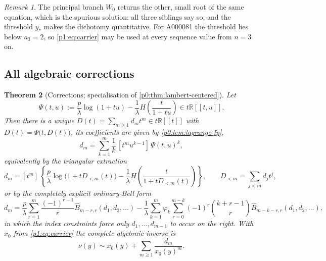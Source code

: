 \documentclass[11pt,a4paper,oneside]{book}
\theoremstyle{plain}
\newtheorem{theorem}{Theorem}[chapter]
\theoremstyle{definition}
\theoremstyle{remark}
\newtheorem{remark}[theorem]{Remark}
\newcommand{\Real}{\mathbb{R}}
\newcommand{\Coef}[1]{[#1]\,}
\newcommand{\OB}{\widehat{B}}
\newcommand{\Wlam}{W}
\begin{document}
\begin{remark}
The principal branch $\Wlam_0$ returns the other, small root of the same equation, which is
the spurious solution: all three siblings say so, and the threshold $y_\ast$ makes the
dichotomy quantitative.  For A000081 the threshold lies below $a_3=2$, so \cref{p1:eq:carrier}
may be used at every sequence value from $n=3$ on.
\end{remark}

\subsection{All algebraic corrections}

\begin{theorem}[Corrections; specialisation of
\cref{p0:thm:lambert-centered}]
\label{p1:thm:d}
Let
\begin{equation}
 \Psi(t,u):=\frac p\lambda\log(1+tu)
 -\frac1\lambda H\!\left(\frac{t}{1+tu}\right)
 \in t\Real[[t,u]] .
 \label{p1:eq:Psi}
\end{equation}
Then there is a unique $D(t)=\sum_{m\ge1}d_mt^{m}\in t\Real[[t]]$ with
$D(t)=\Psi\bigl(t,D(t)\bigr)$, its coefficients are given by \cref{p0:lem:lagrange-fp},
\begin{equation}
 \boxed{\;
 d_m=\sum_{k=1}^{m}\frac1k\,\Coef{t^{m}u^{k-1}}\Psi(t,u)^{k},\;}
 \label{p1:eq:d-master}
\end{equation}
equivalently by the triangular extraction
\begin{equation}
 d_m=\Coef{t^{m}}\left\{
 \frac p\lambda\log\bigl(1+tD_{<m}(t)\bigr)
 -\frac1\lambda H\!\left(\frac{t}{1+tD_{<m}(t)}\right)\right\},
 \qquad D_{<m}=\sum_{j<m}d_jt^{j},
 \label{p1:eq:d-triangular}
\end{equation}
or by the completely explicit ordinary-Bell form
\begin{equation}
 d_m=\frac p\lambda\sum_{r=1}^{m}\frac{(-1)^{r-1}}{r}
 \OB_{m-r,r}(d_1,d_2,\ldots)
 -\frac1\lambda\sum_{k=1}^{m}\varphi_k
 \sum_{r=0}^{m-k}(-1)^{r}\binom{k+r-1}{r}
 \OB_{m-k-r,r}(d_1,d_2,\ldots),
 \label{p1:eq:d-bell}
\end{equation}
in which the index constraints force only $d_1,\ldots,d_{m-1}$ to occur on the right.  With
$x_0$ from \cref{p1:eq:carrier} the complete algebraic inverse is
\begin{equation}
 \boxed{\;\nu(y)\sim x_0(y)+\sum_{m\ge1}\frac{d_m}{x_0(y)^{m}} .\;}
 \label{p1:eq:inverse-series}
\end{equation}
\end{theorem}
\end{document}
